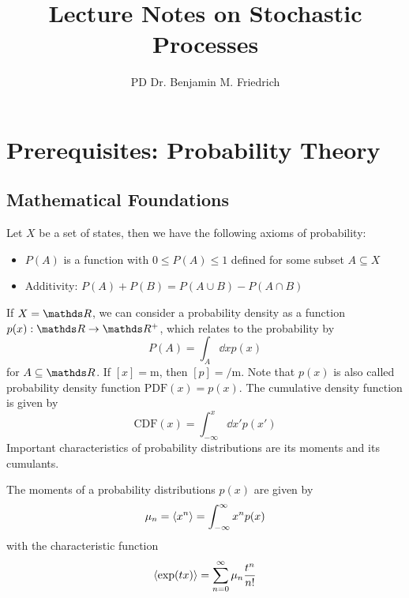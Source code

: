 \documentclass{notebook}
\title{\color{bluebase} Lecture Notes on Stochastic Processes}
\author{PD Dr. Benjamin M. Friedrich}
\begin{document}
	
\frontmatter

\maketitle

\tableofcontents

\mainmatter


\chapter{Prerequisites: Probability Theory}

\section{Mathematical Foundations}

\begin{theorem}
	Let $X$ be a set of states, then we have the following axioms of probability:
	\begin{itemize}
		\item{$P(A)$ is a function with $0 \leq P(A) \leq 1$ defined for some subset $A \subseteq X$}
		\item{Additivity: $P(A) + P(B) = P(A \cup B) - P(A \cap B)$}
	\end{itemize}
\end{theorem}

If $X = \R$, we can consider a probability density as a function $p(x) : \R \to \R^+$, which relates to the probability by
%
\begin{equation}
P(A) = \int_A{\dd{x} p(x)}
\end{equation}
%
for $A \subseteq \R$. If $[x] = \si{\meter}$, then $[p] = \si{\per \meter}$. Note that $p(x)$ is also called probability density function $\mathrm{PDF}(x) = p(x)$. The cumulative density function is given by
%
\begin{equation}
\mathrm{CDF}(x) = \int^x_{-\infty}{\dd{x'} p(x')}
\end{equation}
%
Important characteristics of probability distributions are its moments and its cumulants.

\begin{theorem}[Moments]
	The moments of a probability distributions $p(x)$ are given by
	\begin{equation}
	\mu_n = \expval{x^n} = \int^{\infty}_{-\infty}{x^n p(x)}
	\end{equation}
	with the characteristic function
	\begin{equation}
	\expval{\exp(t x)} = \sum^{\infty}_{n = 0}{\mu_n \frac{t^n}{n!}}
	\end{equation}
\end{theorem}
\end{document}
